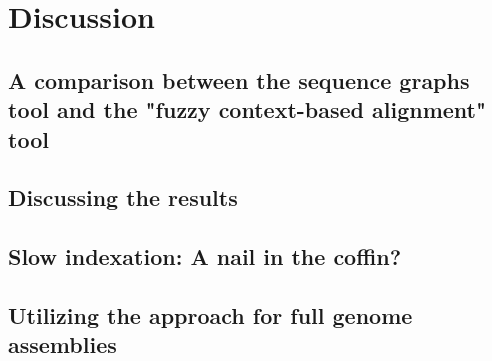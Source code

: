 \documentclass[thesis.tex]{subfiles}
\begin{document}
\chapter{Discussion}
\section{A comparison between the sequence graphs tool and the "fuzzy context-based alignment" tool}
\section{Discussing the results}
\section{Slow indexation: A nail in the coffin?}
\section{Utilizing the approach for full genome assemblies}
\label{sec:assemblies}
\end{document}
